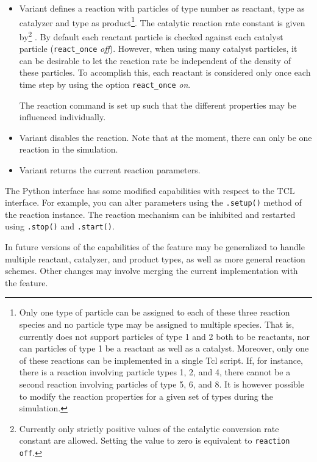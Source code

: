 \begin{itemize}
\item Variant  defines a reaction with particles of type
  number  as reactant, type  as catalyzer and type
   as product\footnote{Only one type of particle can be
    assigned to each of these three reaction species and no particle
    type may be assigned to multiple species. That is, \es currently
    does not support particles of type 1 and 2 both to be reactants,
    nor can particles of type 1 be a reactant as well as a
    catalyst. Moreover, only one of these reactions can be implemented
    in a single Tcl script. If, for instance, there is a reaction
    involving particle types 1, 2, and 4, there cannot be a second
    reaction involving particles of type 5, 6, and 8. It is however
    possible to modify the reaction properties for a given set of
    types during the simulation.}. The catalytic reaction rate
  constant is given by\footnote{Currently only strictly
    positive values of the catalytic conversion rate constant are
    allowed. Setting the value to zero is equivalent to
    \texttt{reaction off}.} . By default each reactant particle is checked against each catalyst particle (\texttt{react\_once} \emph{off}). However, when using many catalyst particles, it can
  be desirable to let the reaction rate be independent of the density of these particles. To accomplish this, each reactant
  is considered only once each time step by using the option
  \texttt{react\_once} \emph{on}.

  The reaction command is set up such that the different properties
  may be influenced individually.
\item Variant  disables the reaction. Note that at the
  moment, there can only be one reaction in the simulation.
\item Variant  returns the current reaction parameters.
\end{itemize}

The Python interface has some modified capabilities with respect to
the TCL interface. For example, you can alter parameters using the
\texttt{.setup()} method of the reaction instance. The reaction
mechanism can be inhibited and restarted using \texttt{.stop()} and
\texttt{.start()}.

In future versions of \es the capabilities of the
 feature may be generalized to handle
multiple reactant, catalyzer, and product types, as well as more
general reaction schemes. Other changes may involve merging the
current implementation with the  feature.


